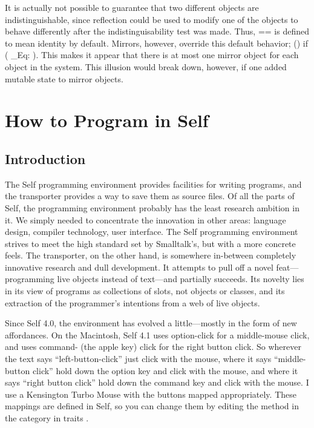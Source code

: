 \documentclass[letterpaper,10pt,english]{sphinxmanual}
\begin{document}
It is actually not possible to guarantee that two different objects are indistinguishable, since reflection
could be used to modify one of the objects to behave differently after the indistinguisability
test was made. Thus, == is defined to mean identity by default. Mirrors, however, override this default
behavior; () if ( \_Eq: ). This makes it appear
that there is at most one mirror object for each object in the system. This illusion would break
down, however, if one added mutable state to mirror objects.


\chapter{How to Program in Self}
\label{howtoprg:how-to-program-in-self}\label{howtoprg::doc}

\section{Introduction}
\label{howtoprg:introduction}
The Self programming environment provides facilities for writing programs, and the transporter
provides a way to save them as source files. Of all the parts of Self, the programming environment
probably has the least research ambition in it. We simply needed to concentrate the innovation in
other areas: language design, compiler technology, user interface. The Self programming environment
strives to meet the high standard set by Smalltalk’s, but with a more concrete feels. The transporter,
on the other hand, is somewhere in-between completely innovative research and dull
development. It attempts to pull off a novel feat—programming live objects instead of text—and
partially succeeds. Its novelty lies in its view of programs as collections of slots, not objects or
classes, and its extraction of the programmer's intentions from a web of live objects.

Since Self 4.0, the environment has evolved a little—mostly in the form of new affordances. On
the Macintosh, Self 4.1 uses option-click for a middle-mouse click, and uses command- (the apple
key) click for the right button click. So wherever the text says “left-button-click” just click with the
mouse, where it says “middle-button click” hold down the option key and click with the mouse,
and where it says “right button click” hold down the command key and click with the mouse. I use
a Kensington Turbo Mouse with the buttons mapped appropriately. These mappings are defined in
Self, so you can change them by editing the  method in the 
category in traits .
\end{document}

